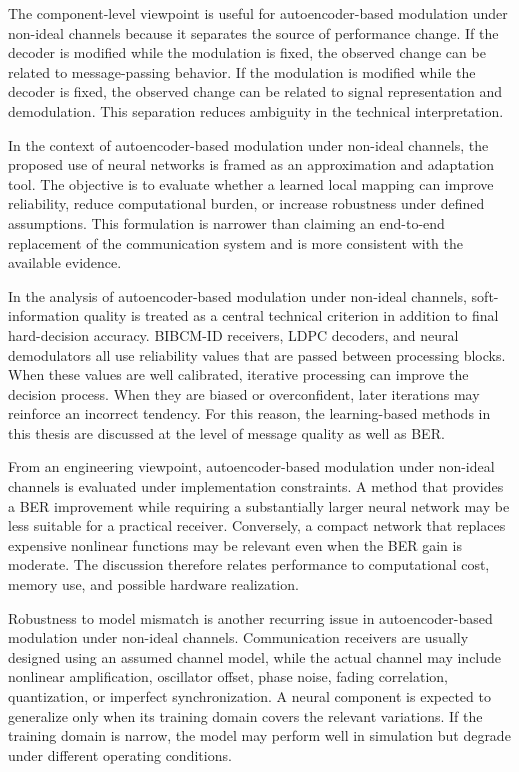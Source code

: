 The component-level viewpoint is useful for autoencoder-based modulation under non-ideal channels because it separates the source of performance change. If the decoder is modified while the modulation is fixed, the observed change can be related to message-passing behavior. If the modulation is modified while the decoder is fixed, the observed change can be related to signal representation and demodulation. This separation reduces ambiguity in the technical interpretation.

In the context of autoencoder-based modulation under non-ideal channels, the proposed use of neural networks is framed as an approximation and adaptation tool. The objective is to evaluate whether a learned local mapping can improve reliability, reduce computational burden, or increase robustness under defined assumptions. This formulation is narrower than claiming an end-to-end replacement of the communication system and is more consistent with the available evidence.

In the analysis of autoencoder-based modulation under non-ideal channels, soft-information quality is treated as a central technical criterion in addition to final hard-decision accuracy. BIBCM-ID receivers, LDPC decoders, and neural demodulators all use reliability values that are passed between processing blocks. When these values are well calibrated, iterative processing can improve the decision process. When they are biased or overconfident, later iterations may reinforce an incorrect tendency. For this reason, the learning-based methods in this thesis are discussed at the level of message quality as well as BER.

From an engineering viewpoint, autoencoder-based modulation under non-ideal channels is evaluated under implementation constraints. A method that provides a BER improvement while requiring a substantially larger neural network may be less suitable for a practical receiver. Conversely, a compact network that replaces expensive nonlinear functions may be relevant even when the BER gain is moderate. The discussion therefore relates performance to computational cost, memory use, and possible hardware realization.

Robustness to model mismatch is another recurring issue in autoencoder-based modulation under non-ideal channels. Communication receivers are usually designed using an assumed channel model, while the actual channel may include nonlinear amplification, oscillator offset, phase noise, fading correlation, quantization, or imperfect synchronization. A neural component is expected to generalize only when its training domain covers the relevant variations. If the training domain is narrow, the model may perform well in simulation but degrade under different operating conditions.

